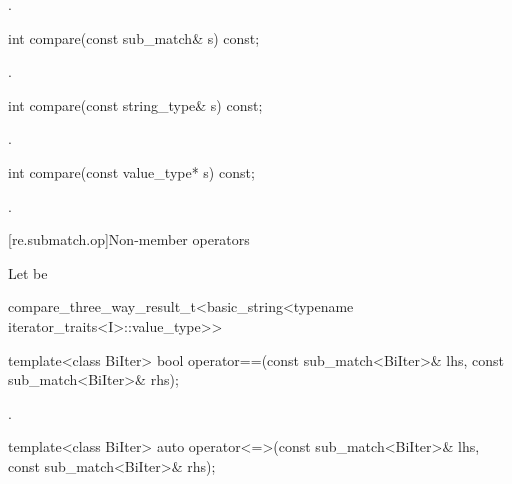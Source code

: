 \begin{itemdescr}
\pnum
\returns
{}.
\end{itemdescr}

%
\begin{itemdecl}
int compare(const sub_match& s) const;
\end{itemdecl}

\begin{itemdescr}
\pnum
\returns
{}.
\end{itemdescr}

%
\begin{itemdecl}
int compare(const string_type& s) const;
\end{itemdecl}

\begin{itemdescr}
\pnum
\returns
{}.
\end{itemdescr}

%
\begin{itemdecl}
int compare(const value_type* s) const;
\end{itemdecl}

\begin{itemdescr}
\pnum
\returns
{}.
\end{itemdescr}

[re.submatch.op]{Non-member operators}

\pnum
Let  be
\begin{codeblock}
compare_three_way_result_t<basic_string<typename iterator_traits<I>::value_type>>
\end{codeblock}

%
\begin{itemdecl}
template<class BiIter>
  bool operator==(const sub_match<BiIter>& lhs, const sub_match<BiIter>& rhs);
\end{itemdecl}

\begin{itemdescr}
\pnum
\returns
{}.
\end{itemdescr}

%
\begin{itemdecl}
template<class BiIter>
  auto operator<=>(const sub_match<BiIter>& lhs, const sub_match<BiIter>& rhs);
\end{itemdecl}

